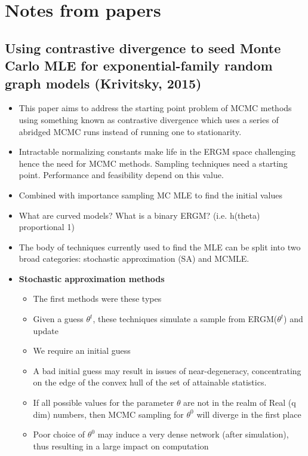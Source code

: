 
\section{Notes from papers}

\subsection{Using contrastive divergence to seed Monte Carlo MLE for exponential-family
random graph models (Krivitsky, 2015)}

\begin{itemize}

    \item This paper aims to address the starting point problem of MCMC methods using something known as contrastive divergence which uses a series of abridged MCMC runs instead of running one to stationarity.
    \item Intractable normalizing constants make life in the ERGM space challenging hence the need for MCMC methods. Sampling techniques need a starting point. Performance and feasibility depend on this value.
    \item Combined with importance sampling MC MLE to find the initial values
    \item What are curved models? What is a binary ERGM? (i.e. h(theta) proportional 1)
    \item The body of techniques currently used to find the MLE can be split into two broad categories: stochastic approximation (SA) and MCMLE.
    \item \textbf{Stochastic approximation methods}
    \begin{itemize}
        \item The first methods were these types
        \item Given a guess $\theta^{t}$, these techniques simulate a sample from ERGM($\theta^{t}$) and update
        \item We require an initial guess
        \item A bad initial guess may result in issues of near-degeneracy, concentrating on the edge of the convex hull of the set of attainable statistics.
        \item If all possible values for the parameter $\theta$ are not in the realm of Real (q dim) numbers, then MCMC sampling for $\theta^{0}$ will diverge in the first place
        \item Poor choice of $\theta^{0}$ may induce a very dense network (after simulation), thus resulting in a large impact on computation

\end{itemize}
\end{itemize}
